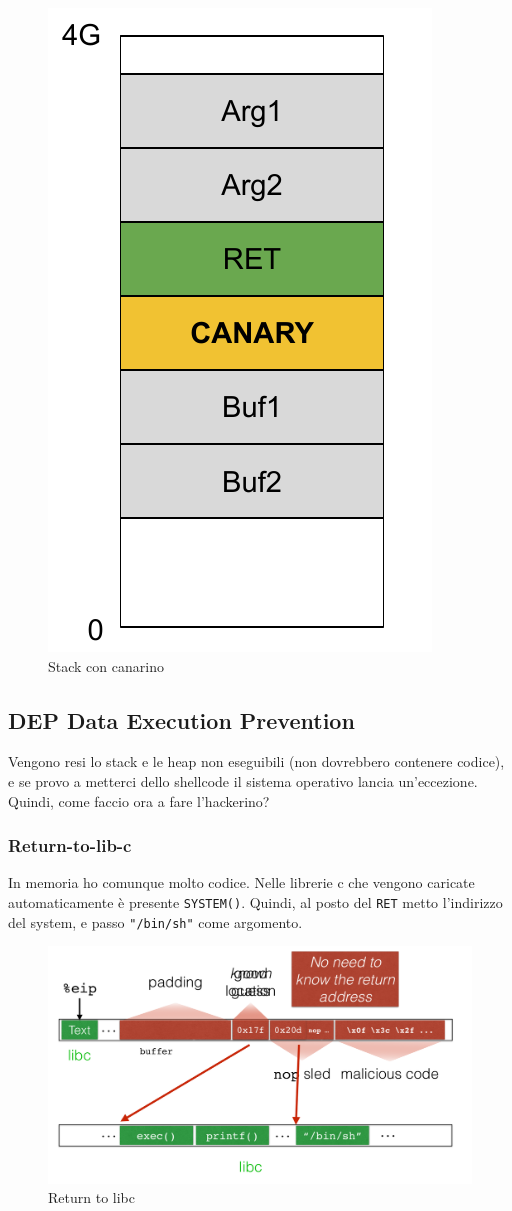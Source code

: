 \documentclass[a4paper,12pt]{article}
\begin{document}
\begin{figure}[H]
	\centering
	\includegraphics[width=0.4\linewidth]{Immagini/Canary1}
	\caption{Stack con canarino}
\end{figure}

\subsection{DEP Data Execution Prevention}
Vengono resi lo stack e le heap non eseguibili (non dovrebbero contenere codice), e se provo a metterci dello shellcode il sistema operativo lancia un'eccezione.\\
Quindi, come faccio ora a fare l'hackerino?
\subsubsection{Return-to-lib-c}
In memoria ho comunque molto codice. Nelle librerie c che vengono caricate automaticamente è presente \texttt{SYSTEM()}. Quindi, al posto del \texttt{RET} metto l'indirizzo del system, e passo \texttt{"/bin/sh"} come argomento.
\begin{figure}[H]
	\centering
	\includegraphics[width=1\linewidth]{Immagini/libc}
	\caption{Return to libc}
\end{figure}
\end{document}
